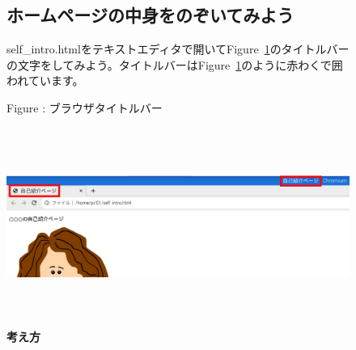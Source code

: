 \documentclass[a4paper,12pt]{jarticle}
\begin{document}
\clearpage
\begin{figure}[ht]
  \subsection{\theExercise ホームページの中身をのぞいてみよう}
  self\_intro.htmlをテキストエディタで開いてFigure~\ref{seq:refFigure31}のタイトルバーの文字をしてみよう。タイトルバーはFigure~\ref{seq:refFigure31}のように赤わくで囲われています。


  \bigskip



  \centering
  \begin{minipage}{17.006cm}
    {\upshape
      Figure {\theFigure\label{seq:refFigure31}}:
      ブラウザタイトルバー}
  \end{minipage}

  \centering
  \includegraphics[width=17.006cm,height=6.482cm]{textbook-img143.png}
  \flushleft
  \textbf{考え方}


\end{figure}
\end{document}
